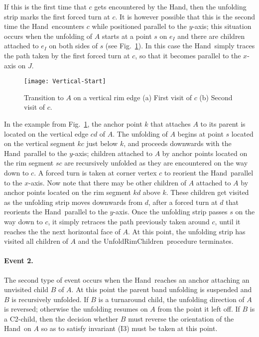 \documentclass[11pt]{article}
\newcommand\hand{{\sc Hand}}
\newcommand\unfoldrim{{\sc UnfoldRimChildren}}
\begin{document}
If this is the first time that $c$ gets encountered by the \hand, then the unfolding strip marks the first forced turn at $c$. It is however possible that this is the second time the \hand\ encounters $c$ while positioned parallel to the $y$-axis; this situation occurs when the unfolding of $A$ starts at a point $s$ on $e_I$ and there are children attached to $e_I$ on both sides of $s$ (see Fig.~\ref{fig:verticalstart}). In this case the \hand\ simply traces the path taken by the first forced turn at $c$, so that it becomes parallel to the $x$-axis on $J$. 

\begin{figure}[htbp]
\centering
\texttt{[image: Vertical-Start]}
\caption{Transition to $A$ on a vertical rim edge (a) First visit of $c$ (b) Second visit of $c$.}
\label{fig:verticalstart}
\end{figure}

In the example from Fig.~\ref{fig:verticalstart}, the anchor point  $k$ that attaches $A$ to its parent is located on the vertical edge $cd$ of $A$. The unfolding of $A$ begins at point $s$ located on the vertical segment $kc$ just below $k$, and proceeds downwards with the \hand\ parallel to the $y$-axis; children attached to $A$ by anchor points located on the rim segment $sc$ are recursively unfolded as they are encountered on the way down to $c$. A forced turn is taken at corner vertex $c$ to reorient the \hand\ parallel to the $x$-axis. Now note that there may be other children of $A$ attached to $A$ by anchor points located on the rim segment $kd$ above $k$. These children get visited as the unfolding strip moves downwards from $d$, after a forced turn at $d$ that reorients the \hand\ parallel to the $y$-axis. Once the unfolding strip passes $s$ on the way down to $c$, it simply retraces the path previously taken around $c$, until it reaches the the next horizontal face of $A$. At this point, the unfolding strip has visited all children of $A$ and the 
\unfoldrim\ procedure terminates. 

\paragraph{Event 2.} The second type of event occurs when the \hand\ reaches an anchor attaching an unvisited child $B$ of $A$. At this point the parent band unfolding is suspended and $B$ is recursively unfolded. If $B$ is a turnaround child, the unfolding direction of $A$ is reversed; otherwise the unfolding resumes on $A$ from the point it left off. If $B$ is a C2-child, then the decision whether $B$ must reverse the orientation of the \hand\ on $A$ so as to satisfy invariant (I3) must be taken at this point. 
\end{document}

